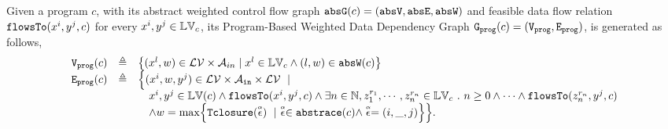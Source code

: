 \begin{defn}
  \label{def:prog_graph}
Given a program $c$, with its abstract weighted control flow graph $\mathtt{abs}{\mathtt{G}}(c) = (\mathtt{abs}{\mathtt{V}}, \mathtt{abs}{\mathtt{E}}, \mathtt{abs}{\mathtt{W}})$ and 
feasible data flow relation $\mathtt{flowsTo}(x^i, y^j, c)$ for every $x^i, y^j \in \mathbb{LV}_c$, its Program-Based Weighted Data Dependency Graph
$\mathtt{{G_{prog}}}(c) = (\mathtt{{V_{prog}}}, \mathtt{{E_{prog}}})$,
is generated as follows,
{\footnotesize
\[
\begin{array}{lcl}
\progV(c) & \triangleq &
\left\{ (x^l, w) \in  \mathcal{LV} \times \mathcal{A}_{in}
\mid
x^l \in \lvar_{{c}} \land (l, w) \in \absW(c)
\right\}
\\
\progE(c) & \triangleq &
   \Big\{ (x^i, w, y^j) \in \mathcal{LV} \times 
   \mathcal{A}_{\kw{in}} \times \mathcal{LV}
~\mid~
  \\ & & \quad 
x^i, y^j \in \lvar(c) \land \flowsto(x^i, y^j, c) \land
  \exists n \in \mathbb{N}, z_1^{r_1}, \cdots, z_n^{r_n} \in \lvar_{{c}} \sthat 
  n \geq 0 
  \land \cdots \land \flowsto(z_n^{r_n}, y^j, c) 
  \\ & & \quad 
  \land
  w = \max \left\{ \absclr(\absevent) ~\mid~ \absevent \in \absflow(c) \land \absevent = (i, \_, j) \right\} 
\Big\}.
\end{array}
\] }
\end{defn}


